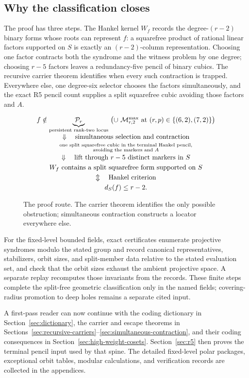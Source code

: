 \subsection{Why the classification closes}

The proof has three steps.  The Hankel kernel \(W_f\) records the
degree-\((r-2)\) binary forms whose roots can represent \(f\): a squarefree
product of rational linear factors supported on \(S\) is exactly an
\((r-2)\)-column representation.  Choosing one factor contracts both the
syndrome and the witness problem by one degree; choosing \(r-5\) factors
leaves a redundancy-five pencil of binary cubics.  The recursive carrier
theorem identifies when every such contraction is trapped.  Everywhere else,
one degree-six selector chooses the factors simultaneously, and the exact R5
pencil count supplies a split squarefree cubic avoiding those factors and \(A\).

\begin{figure}[H]
\centering
\[
\begin{array}{c}
f\notin
\underbrace{\mathcal P_r}_{\text{persistent rank-two locus}}
\ \bigl(\cup\ \mathcal M^{\max}_{r,2}\text{ at }(r,p)\in\{(6,2),(7,2)\}\bigr)\\[1mm]
\Downarrow\quad\text{simultaneous selection and contraction}\\[1mm]
\substack{\text{one split squarefree cubic in the terminal Hankel pencil,}\\
          \text{avoiding the markers and }A}\\[1mm]
\Downarrow\quad\text{lift through }r-5\text{ distinct markers in }S\\[1mm]
W_f\text{ contains a split squarefree form supported on }S\\[1mm]
\Updownarrow\quad\text{Hankel criterion}\\[1mm]
d_S(f)\le r-2.
\end{array}
\]
\caption{The proof route.  The carrier theorem identifies the only possible
obstruction; simultaneous contraction constructs a locator everywhere else.}
\label{fig:headline-proof-route}
\end{figure}

For the fixed-level bounded fields, exact certificates enumerate projective
syndromes modulo the stated group and record
canonical representatives, stabilizers, orbit sizes, and split-member data
relative to the stated evaluation set,
and check that the orbit sizes exhaust the ambient projective space.  A
separate replay recomputes those invariants from the records.  These finite
steps complete the split-free geometric classification only in the named fields;
covering-radius promotion to deep holes remains a separate cited input.

A first-pass reader can now continue with the coding dictionary in
Section~\ref{sec:dictionary}, the carrier and escape theorems in
Sections~\ref{sec:recursive-carriers}--\ref{sec:simultaneous-contraction},
and their coding consequences in Section~\ref{sec:high-weight-cosets}.
Section~\ref{sec:r5} then proves the terminal pencil input used by that
spine.  The detailed fixed-level polar packages, exceptional orbit tables,
modular calculations, and verification records are collected in the
appendices.

